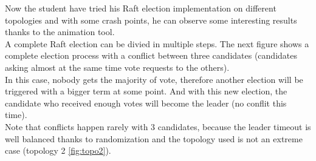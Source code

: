\documentclass{eplmastersthesis}
\begin{document}
        Now the student have tried his Raft election implementation on
        different topologies and with some crash points, he can observe some
        interesting results thanks to the animation tool.\\
        A complete Raft election can be divied in multiple steps. The next
        figure shows a complete election process with a conflict between
        three candidates (candidates asking almost at the same time vote
        requests to the others).\\
        In this case, nobody gets the majority of vote, therefore another
        election will be triggered with a bigger term at some point.
        And with this new election, the candidate who received enough votes
        will become the leader (no conflit this time).\\
        Note that conflicts happen rarely with 3 candidates, because the
        leader timeout is well balanced thanks to randomization and the
        topology used is not an extreme case (topology 2 \ref{fig:topo2}).
\end{document}
